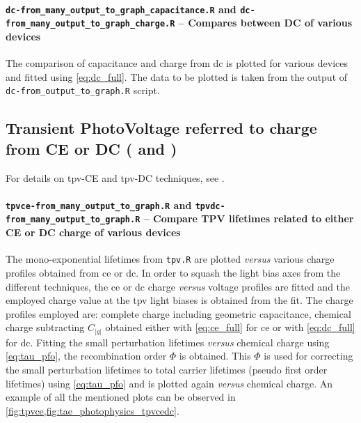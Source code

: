 %		
%		
		\paragraph{\texttt{dc-from\_many\_output\_to\_graph\_capacitance.R} and \texttt{dc-\-from\_many\_output\_to\_graph\_charge.R} -- Compares between DC of various devices}
		The comparison of capacitance and charge from \gls{dc} is plotted for various devices and fitted using \cref{eq:dc_full}.
		The data to be plotted is taken from the output of \texttt{dc-\-from\_output\_to\_graph.R} script.

	\subsection{Transient PhotoVoltage referred to charge from CE or DC ( and )}\label{r_tpvcedc}
		For details on \gls{tpv}-CE and \gls{tpv}-DC techniques, see .
%
%
%
		
				\paragraph{\texttt{tpvce-\-from\_many\_output\_to\_graph.R} and \texttt{tpvdc-\-from\_many\_output\_to\_graph.R} -- Compare TPV lifetimes related to either CE or DC charge of various devices}
The mono\hyp{}exponential lifetimes from \texttt{tpv.R} are plotted \textsl{versus} various charge profiles obtained from \gls{ce} or \gls{dc}.
In order to squash the light bias axes from the different techniques, the \gls{ce} or \gls{dc} charge \textsl{versus} voltage profiles are fitted and the employed charge value at the \gls{tpv} light biases is obtained from the fit.
The charge profiles employed are: complete charge including geometric capacitance, chemical charge subtracting $C_|g|$ obtained either with \cref{eq:ce_full} for \gls{ce} or with \cref{eq:dc_full} for \gls{dc}.
Fitting the small perturbation lifetimes \textsl{versus} chemical charge using \cref{eq:tau_pfo}, the recombination order $\Phi$ is obtained.
This $\Phi$ is used for correcting the small perturbation lifetimes to total carrier lifetimes (pseudo first order lifetimes) using \cref{eq:tau_pfo} and is plotted again \textsl{versus} chemical charge.
An example of all the mentioned plots can be observed in \cref{fig:tpvce,fig:tae_photophysics_tpvcedc}.


